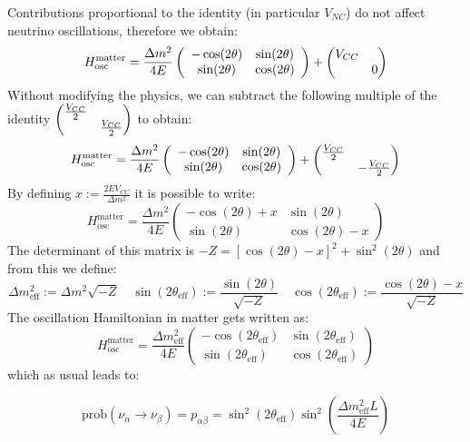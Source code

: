 \documentclass[10.75pt,a4paper,openright,bottom=2cm]{article}
\newcommand{\beginbox}[1]{\begin{tcolorbox}[width=\textwidth,colback={black!40},title={#1},colbacktitle={purple!55},coltitle=black]}
\renewcommand{\endbox}{\end{tcolorbox}\noindent}
\begin{document}
Contributions proportional to the identity (in particular $V_{NC}$) do not affect neutrino oscillations, therefore we obtain:
\[
H_{\text{osc}}^{\text{matter}}=\frac{\Delta m^2}{4E}\left(\begin{array}{cc}
    -\cos(2\theta) & \sin(2\theta) \\
    \sin(2\theta) & \cos(2\theta)
\end{array}\right)+\mqty(\dmat{V_{CC},0})
\]
Without modifying the physics, we can subtract the following multiple of the identity $\mqty(\dmat{\frac{V_{CC}}{2},\frac{V_{CC}}{2}})$ to obtain:
\[
H_{\text{osc}}^{\text{matter}}=\frac{\Delta m^2}{4E}\left(\begin{array}{cc}
    -\cos(2\theta) & \sin(2\theta) \\
    \sin(2\theta) & \cos(2\theta)
\end{array}\right)+\mqty(\dmat{\frac{V_{CC}}{2},-\frac{V_{CC}}{2}})
\]
By defining $x:=\frac{2EV_{CC}}{\Delta m^2}$ it is possible to write:
\[
H_{\text{osc}}^{\text{matter}}=\frac{\Delta m^2}{4E}\left(\begin{array}{cc}
    -\cos(2\theta)+x & \sin(2\theta) \\
    \sin(2\theta) & \cos(2\theta)-x
\end{array}\right)
\]
The determinant of this matrix is $-Z=[\cos(2\theta)-x]^2+\sin^2(2\theta)$ and from this we define:
\[
\Delta m^2_{\text{eff}}:=\Delta m^2\sqrt{-Z} \quad \sin(2\theta_{\text{eff}}):=\frac{\sin(2\theta)}{\sqrt{-Z}} \quad \cos(2\theta_{\text{eff}}):=\frac{\cos(2\theta)-x}{\sqrt{-Z}}
\]
The oscillation Hamiltonian in matter gets written as:
\[
H_{\text{osc}}^{\text{matter}}=\frac{\Delta m^2_{\text{eff}}}{4E}\left(\begin{array}{cc}
    -\cos(2\theta_{\text{eff}}) & \sin(2\theta_{\text{eff}}) \\
    \sin(2\theta_{\text{eff}}) & \cos(2\theta_{\text{eff}})
\end{array}\right)
\]
which as usual leads to:
\beginbox{Oscillation Probability in Matter}
\[
\text{prob}(\nu_\alpha\to\nu_\beta)=p_{\alpha\beta}=\sin^2(2\theta_{\text{eff}})\sin^2\left(\frac{\Delta m^2_{\text{eff}}L}{4E}\right)
\]
\endbox
\end{document}
